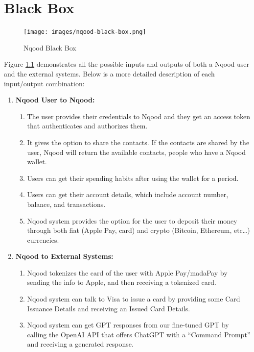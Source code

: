 \documentclass[a4paper]{report}
\begin{document}
\chapter{Black Box}

\begin{figure}[h!]
    \centering
    \texttt{[image: images/nqood-black-box.png]}
    \caption{Nqood Black Box}
    \label{fig:black-box}
\end{figure}

Figure \ref{fig:black-box} demonstrates all the possible inputs and outputs of both a Nqood user and the external systems. Below is a more detailed description of each input/output combination:

\begin{enumerate}
    \item \textbf{Nqood User to Nqood:}
          \begin{enumerate}
              \item The user provides their credentials to Nqood and they get an access token that authenticates and authorizes them.
              \item It gives the option to share the contacts. If the contacts are shared by the user, Nqood will return the available contacts, people who have a Nqood wallet.
              \item Users can get their spending habits after using the wallet for a period.
              \item Users can get their account details, which include account number, balance, and transactions.
              \item Nqood system provides the option for the user to deposit their money through both fiat (Apple Pay, card) and crypto (Bitcoin, Ethereum, etc…) currencies.
          \end{enumerate}
    \item \textbf{Nqood to External Systems:}
          \begin{enumerate}
              \item Nqood tokenizes the card of the user with Apple Pay/madaPay by sending the info to Apple, and then receiving a tokenized card.
              \item Nqood system can talk to Visa to issue a card by providing some Card Issuance Details and receiving an Issued Card Details.
              \item Nqood system can get GPT responses from our fine-tuned GPT by calling the OpenAI API that offers ChatGPT with a “Command Prompt” and receiving a generated response.

\end{enumerate}
\end{enumerate}
\end{document}
